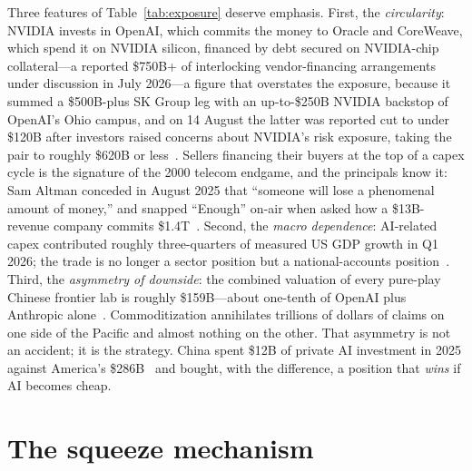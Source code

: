 Three features of Table~\ref{tab:exposure} deserve emphasis. First, the \emph{circularity}: NVIDIA invests in OpenAI, which commits the money to Oracle and CoreWeave, which spend it on NVIDIA silicon, financed by debt secured on NVIDIA-chip collateral---a reported \$750B+ of interlocking vendor-financing arrangements under discussion in July 2026---a figure that overstates the exposure, because it summed a \$500B-plus SK Group leg with an up-to-\$250B NVIDIA backstop of OpenAI's Ohio campus, and on 14 August the latter was reported cut to under \$120B after investors raised concerns about NVIDIA's risk exposure, taking the pair to roughly \$620B or less~\cite{circular-deals,nvidia-backstop}. Sellers financing their buyers at the top of a capex cycle is the signature of the 2000 telecom endgame, and the principals know it: Sam Altman conceded in August 2025 that ``someone will lose a phenomenal amount of money,'' and snapped ``Enough'' on-air when asked how a \$13B-revenue company commits \$1.4T~\cite{altman-bubble,altman-enough}. Second, the \emph{macro dependence}: AI-related capex contributed roughly three-quarters of measured US GDP growth in Q1 2026; the trade is no longer a sector position but a national-accounts position~\cite{gdp-ai}. Third, the \emph{asymmetry of downside}: the combined valuation of every pure-play Chinese frontier lab is roughly \$159B---about one-tenth of OpenAI plus Anthropic alone~\cite{datagravity}. Commoditization annihilates trillions of dollars of claims on one side of the Pacific and almost nothing on the other. That asymmetry is not an accident; it is the strategy. China spent \$12B of private AI investment in 2025 against America's \$286B~\cite{stanford-aiindex-2026} and bought, with the difference, a position that \emph{wins} if AI becomes cheap.

\section{The squeeze mechanism}
\label{sec:squeeze}

